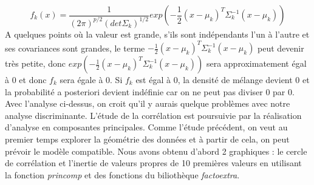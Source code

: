 \documentclass[a4paper,11pt,oneside,roman]{article}
\begin{document}
\begin{equation}
    f_k(x) = \frac{1}{(2\pi)^{p/2}(det\Sigma_k)^{1/2}}exp\left( -\frac{1}{2}(x-\mu_k)^{T}\Sigma_k^{-1}(x-\mu_k)\right)
\end{equation}
A quelques points où la valeur est grande, s'ils sont indépendants l'un à l'autre et ses covariances sont grandes, le terme $-\frac{1}{2}(x-\mu_k)^{T}\Sigma_k^{-1}(x-\mu_k)$ peut devenir très petite, donc $exp\left( -\frac{1}{2}(x-\mu_k)^{T}\Sigma_k^{-1}(x-\mu_k)\right)$ sera approximatement égal à 0 et donc $f_k$ sera égale à 0. Si $f_k$ est égal à 0, la densité de mélange devient 0 et la probabilité a posteriori devient indéfinie car on ne peut pas diviser 0 par 0. Avec l'analyse ci-dessus, on croit qu'il y aurais quelque problèmes avec notre analyse discriminante. \newline
L'étude de la corrélation est poursuivie par la réalisation d'analyse en composantes principales. Comme l'étude précédent, on veut au premier temps explorer la géométrie des données et à partir de cela, on peut prévoir le modèle compatible. \newline
Nous avons obtenu d'abord 2 graphiques : le cercle de corrélation et l'inertie de valeurs propres de 10 premières valeurs en utilisant la fonction \textit{princomp} et des fonctions du biliothèque \textit{factoextra}.
\end{document}
